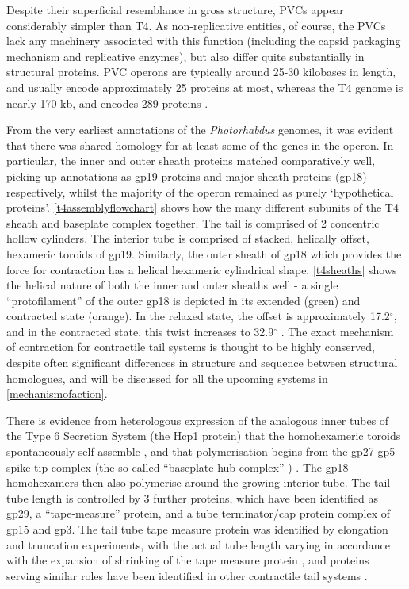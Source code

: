 Despite their superficial resemblance in gross structure, PVCs appear considerably simpler than T4. As non-replicative entities, of course, the PVCs lack any machinery associated with this function (including the capsid packaging mechanism and replicative enzymes), but also differ quite substantially in structural proteins. PVC operons are typically around 25-30 kilobases in length, and usually encode approximately 25 proteins at most, whereas the T4 genome is nearly 170 kb, and encodes 289 proteins \citep{Miller2003}. 

From the very earliest annotations of the \emph{Photorhabdus} genomes, it was evident that there was shared homology for at least some of the genes in the operon. In particular, the inner and outer sheath proteins matched comparatively well, picking up annotations as gp19 proteins and major sheath proteins (gp18) respectively, whilst the majority of the operon remained as purely `hypothetical proteins'.  \vref{t4assemblyflowchart} shows how the many different subunits of the T4 sheath and baseplate complex together. The tail is comprised of 2 concentric hollow cylinders. The interior tube is comprised of stacked, helically offset, hexameric toroids of gp19. Similarly, the outer sheath of gp18 which provides the force for contraction has a helical hexameric cylindrical shape. \vref{t4sheaths} shows the helical nature of both the inner and outer sheaths well - a single ``protofilament'' of the outer gp18 is depicted in its extended (green) and contracted state (orange). In the relaxed state, the offset is approximately 17.2$^{\circ}$, and in the contracted state, this twist increases to 32.9$^{\circ}$ \citep{Kube2015a, Kostyuchenko2005, Leiman2004}. The exact mechanism of contraction for contractile tail systems is thought to be highly conserved, despite often significant differences in structure and sequence between structural homologues, and will be discussed for all the upcoming systems in \vref{mechanismofaction}.

There is evidence from heterologous expression of the analogous inner tubes of the Type 6 Secretion System (the Hcp1 protein) that the homohexameric toroids spontaneously self-assemble \citep{Ballister2008}, and that polymerisation begins from the gp27-gp5 spike tip complex (the so called ``baseplate hub complex'' \citep{Lan2014}) \citep{Kanamaru2002}. The gp18 homohexamers then also polymerise around the growing interior tube. The tail tube length is controlled by 3 further proteins, which have been identified as gp29, a ``tape-measure'' protein, and a tube terminator/cap protein complex of gp15 and gp3. The tail tube tape measure protein was identified by elongation and truncation experiments, with the actual tube length varying in accordance with the expansion of shrinking of the tape measure protein \citep{Abuladze1994}, and proteins serving similar roles have been identified in other contractile tail systems \citep{Katsura1987,Katsura1984, Isao1990}.

